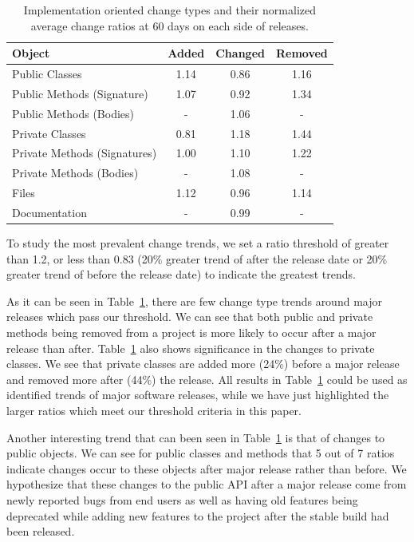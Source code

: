 \documentclass[conference]{IEEEtran}
\begin{document}
\begin{table}[h]
\begin{center}
\tabcolsep=0.11cm
\begin{tabular}{| l | c | c | c |}
\hline
Object & Added & Changed & Removed\\
\hline
Public Classes & 1.14 & 0.86 & 1.16 \\
Public Methods (Signature) & 1.07 & 0.92 & 1.34 \\
Public Methods (Bodies) & - & 1.06 & - \\
Private Classes & 0.81 & 1.18 & 1.44 \\
Private Methods (Signatures) & 1.00 & 1.10 & 1.22 \\
Private Methods (Bodies) & - & 1.08 & - \\
Files & 1.12 & 0.96 & 1.14 \\
Documentation & - & 0.99 & - \\
\hline
\end{tabular}
\end{center}
\caption{Implementation oriented change types and their normalized average change ratios at 60 days on each side of releases. \label{tab:ratio}}
\end{table}

To study the most prevalent change trends, we set a ratio threshold of greater than 1.2, or less than 0.83 (20\% greater trend of after the release date
or 20\% greater trend of before the release date) to indicate the greatest trends.

As it can be seen in Table~\ref{tab:ratio}, there are few change type trends around major releases which pass our threshold. We can see that both public
and private methods
being removed from a project is more likely to occur after a major release than after. Table~\ref{tab:ratio} also shows significance in the changes to private
classes. We see that private classes are added more (24\%) before a major release and removed more after (44\%) the release. 
All results in Table~\ref{tab:ratio} could be used as identified trends of major software releases, while we have just highlighted the larger ratios
which meet our threshold criteria in this paper.

Another interesting trend that can been seen in Table~\ref{tab:ratio} is that of changes to public objects. We can see for public classes and methods that
5 out of 7 ratios indicate changes occur to these objects after major release rather than before. We hypothesize that these changes to the public API
after a major release come from newly reported bugs from end users as well as having old features being deprecated while adding new features to the project
after the stable build had been released.
\end{document}
